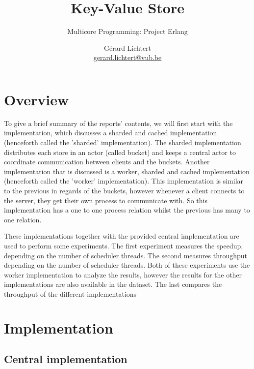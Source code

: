\documentclass{article}
\title{Key-Value Store}
\subtitle{Multicore Programming: Project Erlang}
\author{Gérard Lichtert \\
\href{mailto:gerard.lichtert@vub.be}{gerard.lichtert@vub.be}}
\begin{document}
\maketitle

\tableofcontents
\newpage
\raggedright

\section{Overview}
To give a brief summary of the reports' contents, we will first start with the
implementation, which discusses a sharded and cached implementation (henceforth
called the 'sharded' implementation). The sharded implementation distributes
each store in an actor (called bucket) and keeps a central actor to coordinate communication
between clients and the buckets. Another implementation that is discussed is a
worker, sharded and cached implementation (henceforth called the 'worker'
implementation). This implementation is similar to the previous in regards of
the buckets, however whenever a client connects to the server, they get their
own process to communicate with. So this implementation has a one to one process
relation whilst the previous has many to one relation.
\par
These implementations together with the provided central implementation are used
to perform some experiments. The first experiment measures the speedup,
depending on the number of scheduler threads. The second measures throughput
depending on the number of scheduler threads. Both of these experiments use the
worker implementation to analyze the results, however the results for the other
implementations are also available in the dataset.
The last compares the throughput of the different implementations
\section{Implementation}
\subsection{Central implementation}
\end{document}
